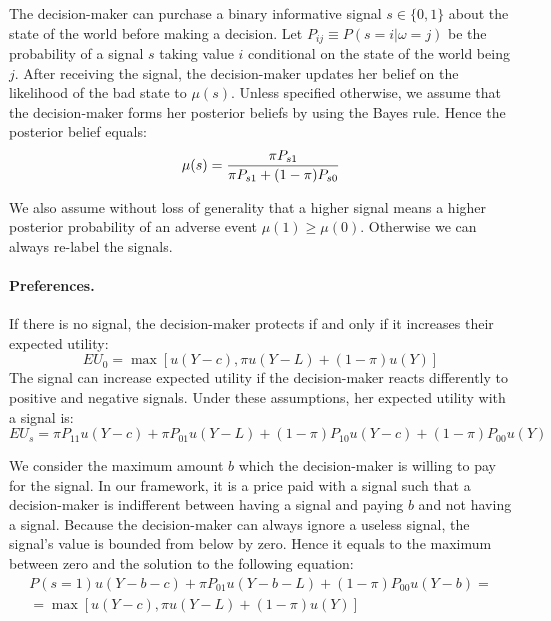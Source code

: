 \documentclass[12pt,a4paper]{article}
\begin{document}
The decision-maker can purchase a binary informative signal $s\in\{0,1\}$ about the state of the world before making a decision. Let $P_{ij}\equiv P(s=i|\omega=j)$ be the probability of a signal $s$ taking value $i$ conditional on the state of the world being $j$.  After receiving the signal, the decision-maker updates her belief on the likelihood of the bad state to $\mu(s)$. Unless specified otherwise, we assume that the decision-maker forms her posterior beliefs by using the Bayes rule. Hence the posterior belief equals:
\begin{equation}
\mu(s)= {\pi P_{s1} \over \pi P_{s1}+(1-\pi)P_{s0}}
\end{equation}

We also assume without loss of generality that a higher signal means a higher posterior probability of an adverse event $\mu(1)\geq\mu(0)$. Otherwise we can always re-label the signals.

\vspace{10pt}
\paragraph{Preferences.} If there is no signal, the decision-maker protects if and only if it increases their expected utility:
\begin{equation}
EU_0=\max[u(Y-c),\pi u(Y-L)+(1-\pi) u(Y)]
\end{equation}
The signal can increase expected utility if the decision-maker reacts differently to positive and negative signals. Under these assumptions, her expected utility with a signal is:
\begin{equation}
EU_s=\pi P_{11}u(Y-c)+\pi P_{01}u(Y-L)+(1-\pi)P_{10}u(Y-c)+(1-\pi)P_{00}u(Y)
\end{equation}

We consider the maximum amount $b$ which the decision-maker is willing to pay for the signal. In our framework, it is a price paid with a signal such that a decision-maker is indifferent between having a signal and paying $b$ and not having a signal. Because the decision-maker can always ignore a useless signal, the signal's value is bounded from below by zero. Hence it equals to the maximum between zero and the solution to the following equation:
\begin{equation}
\begin{split}
P(s=1)u(Y-b-c)+\pi P_{01}u(Y-b-L)+(1-\pi)P_{00}u(Y-b)=\\=\max[u(Y-c),\pi u(Y-L)+(1-\pi) u(Y)] 
\end{split}
\end{equation}
\end{document}
